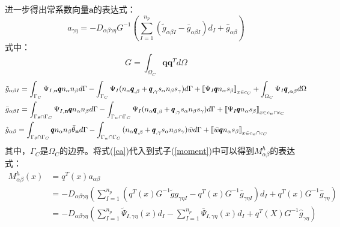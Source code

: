\documentclass[a4paper]{article}
\begin{document}
进一步得出常系数向量$\pmb{a}$的表达式：
\begin{equation}\label{ca}
    a_{\gamma\eta}=-D_{\alpha\beta\gamma\eta}G^{-1}(\sum_{I=1}^{n_p}(\tilde{g}_{\alpha\beta I}-\bar{g}_{\alpha\beta I})d_I+\hat{g}_{\alpha\beta})
\end{equation}
式中：
\begin{equation}
    G=\int_{\Omega_C}\pmb{q}\pmb{q}^Td\Omega
\end{equation}
\begin{equation}
\begin{split}
    &{\tilde g}_{\alpha\beta I} = \int_{{\Gamma _C}}^{}{{\Psi _{I,{\bf{n}}}}{\pmb{q}}{n_\alpha }{n_\beta }d\Gamma }-\int_{{\Gamma _C}}^{}{{\Psi _I}({n_\alpha }{{\pmb{q}}_{,\beta }} + {{\pmb{q}}_{,\gamma }}{s_\alpha}{n_\beta }{s_\gamma})d\Gamma }  + {\left[\kern-0.15em\left[ {{\Psi _I}{\pmb{q}}{n_\alpha }{s_\beta }} 
     \right]\kern-0.15em\right]_{{{x}} \in {c_C}}} + \int_{{\Omega _C}}^{} {{\Psi _I}{{\pmb{q}}_{,\alpha \beta }}d\Omega } \\
    &{\bar g}_{\alpha \beta I} = \int_{{\Gamma _\theta } \cap {\Gamma _C}}^{} {{\Psi _{I,{\bf{n}}}}{\pmb{q}}{n_\alpha }{n_\beta }d\Gamma }  - \int_{{\Gamma _w} \cap {\Gamma _C}}^{} {{\Psi _I}({n_\alpha }{{\pmb{q}}_{,\beta }} + {{\pmb{q}}_{,\gamma }}{s_\alpha }{n_\beta }{s_\gamma })d\Gamma }  + {\left[\kern-0.15em\left[ {{\Psi _I}{\pmb{q}}{n_\alpha }{s_\beta }} 
     \right]\kern-0.15em\right]_{{{x}} \in {c_w} \cap {c_C}}}\\
    &\hat{g}_{\alpha \beta }= \int_{{\Gamma _\theta } \cap {\Gamma _C}}^{} {{\pmb{q}}{n_\alpha }{n_\beta }{{\bar \theta }_{\bf{n}}}d\Gamma }  - \int_{{\Gamma _w} \cap {\Gamma _C}}^{} {({n_\alpha }{{\pmb{q}}_{,\beta }} + {{\pmb{q}}_{,\gamma }}{s_\alpha }{n_\beta }{s_\gamma })\bar wd\Gamma }  + {\left[\kern-0.15em\left[ {\bar w{\pmb{q}}{n_\alpha }{s_\beta }} 
     \right]\kern-0.15em\right]_{{{x}} \in {c_w} \cap {c_C}}}
\end{split}
\end{equation}
其中，$\Gamma_C$是$\Omega_C$的边界。将式(\ref{ca})代入到式子(\ref{moment})中可以得到${M}^h_{\alpha\beta}$的表达式：
\begin{equation}
\begin{split}
M_{\alpha\beta}^h(x)&=q^T(x)a_{\alpha\beta}\\
&=-D_{\alpha\beta\gamma\eta}(\sum_{I=1}^{n_p}(q^T(x)G^{-1}\tilde{g}g_{\gamma\eta I}-q^T(x)G^{-1}\bar{g}_{\gamma\eta I})d_I+q^T(x)G^{-1}\hat{g}_{\gamma\eta})\\
&=-D_{\alpha\beta\gamma\eta}(\sum_{I=1}^{n_p}\tilde{\Psi}_{I,\gamma\eta}(x)d_I-\sum_{I=1}^{n_p}\bar{\Psi}_{I,\gamma\eta}(x)d_I+q^T(X)G^{-1}\hat{g}_{\gamma\eta})
\end{split}
\end{equation}
\end{document}

